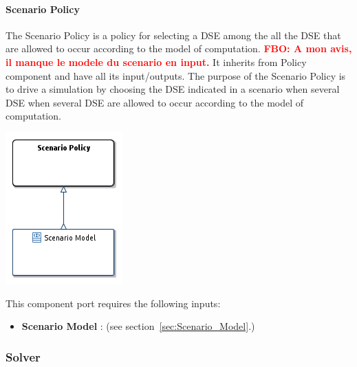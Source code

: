 \documentclass{gemoc} %
\begin{document}
\paragraph{Scenario Policy}
\label{sec:Scenario_Policy}
The Scenario Policy is a policy for selecting a DSE among the all the DSE that are allowed to occur according to the model of computation.
\textcolor{red}{\textbf{FBO: A mon avis, il manque le modele du scenario en input.}}
It inherits from Policy component and have all its input/outputs.
The purpose of the Scenario Policy is to drive a simulation by choosing the DSE indicated in a scenario when several DSE when several DSE are allowed to occur according to the model of computation.
\begin{center}
\includegraphics*[trim=0.0cm 0.0cm 0cm 0.0cm, clip=true]{../images/generated/Generated_Scenario_Policy.png}
\end{center}

This component port requires the following inputs:
\begin{itemize}
  \item \textbf{Scenario Model} :
(see section~\ref{sec:Scenario_Model}.)
\end{itemize}




\subsubsection{Solver}
\label{sec:Solver}

\end{document}
